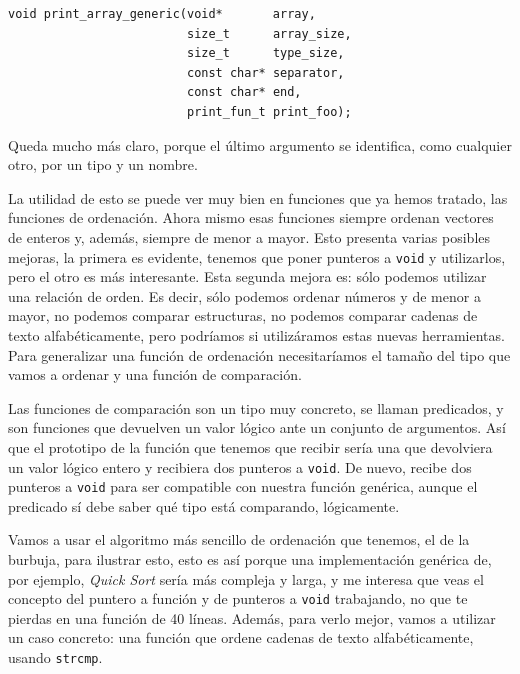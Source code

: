 \documentclass[a4paper]{article}
\begin{document}
\noindent
\begin{minipage}[H]{\linewidth}
\mbox{}
\begin{lstlisting}[style=C,
caption={Ejemplo final de función que recibe un puntero},
label={lst:finalPointerFunction}]
void print_array_generic(void*       array,
                         size_t      array_size,
                         size_t      type_size,
                         const char* separator,
                         const char* end,
                         print_fun_t print_foo);
\end{lstlisting}
\end{minipage}
Queda mucho más claro, porque el último argumento se identifica,
como cualquier otro, por un tipo y un nombre.

La utilidad de esto se puede ver muy bien en funciones que ya hemos tratado,
las funciones de ordenación. Ahora mismo esas funciones siempre ordenan vectores
de enteros y, además, siempre de menor a mayor. Esto presenta varias posibles mejoras,
la primera es evidente, tenemos que poner punteros a \verb!void! y utilizarlos,
pero el otro es más interesante. Esta segunda mejora es: sólo podemos utilizar
una relación de orden. Es decir, sólo podemos ordenar números y de menor a
mayor, no podemos comparar estructuras, no podemos comparar cadenas de texto
alfabéticamente, pero podríamos si utilizáramos estas nuevas herramientas.
Para generalizar una función de ordenación necesitaríamos el tamaño del tipo que
vamos a ordenar y una función de comparación.

Las funciones de comparación son un tipo muy concreto, se llaman
predicados, y son funciones que devuelven un valor lógico ante un conjunto
de argumentos. Así que el prototipo de la función que tenemos que
recibir sería una que devolviera un valor lógico entero y recibiera dos punteros
a \verb!void!. De nuevo, recibe dos punteros a \verb!void! para ser compatible
con nuestra función genérica, aunque el predicado sí debe saber qué
tipo está comparando, lógicamente.

Vamos a usar el algoritmo más sencillo de ordenación que tenemos, el de la
burbuja, para ilustrar esto, esto es así porque una implementación genérica
de, por ejemplo, \textit{Quick Sort} sería más compleja y larga, y me interesa
que veas el concepto del puntero a función y de punteros a \verb!void!
trabajando, no que te pierdas en una función de 40 líneas. Además, para verlo
mejor, vamos a utilizar un caso concreto: una función que ordene cadenas
de texto alfabéticamente, usando \verb!strcmp!.
\end{document}
